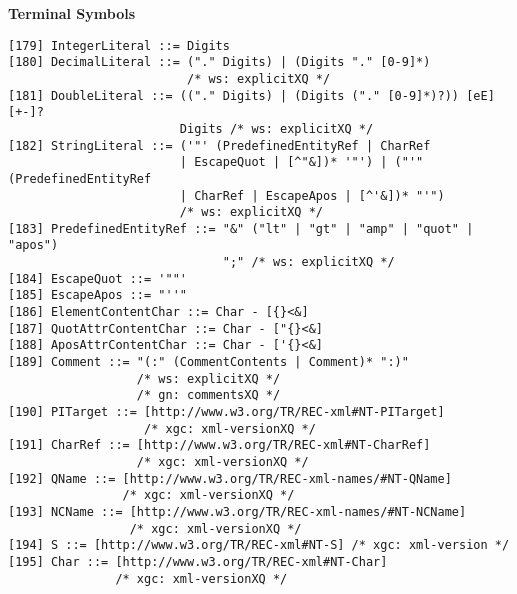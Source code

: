 \textbf{Terminal Symbols}
\begin{verbatim}
[179] IntegerLiteral ::= Digits
[180] DecimalLiteral ::= ("." Digits) | (Digits "." [0-9]*)	
                         /* ws: explicitXQ */
[181] DoubleLiteral ::= (("." Digits) | (Digits ("." [0-9]*)?)) [eE] [+-]?
                        Digits /* ws: explicitXQ */
[182] StringLiteral ::= ('"' (PredefinedEntityRef | CharRef 
                        | EscapeQuot | [^"&])* '"') | ("'" (PredefinedEntityRef
                        | CharRef | EscapeApos | [^'&])* "'")	
                        /* ws: explicitXQ */
[183] PredefinedEntityRef ::= "&" ("lt" | "gt" | "amp" | "quot" | "apos")
                              ";" /* ws: explicitXQ */
[184] EscapeQuot ::= '""'
[185] EscapeApos ::= "''"
[186] ElementContentChar ::= Char - [{}<&]
[187] QuotAttrContentChar ::= Char - ["{}<&]
[188] AposAttrContentChar ::= Char - ['{}<&]
[189] Comment ::= "(:" (CommentContents | Comment)* ":)"
                  /* ws: explicitXQ */
                  /* gn: commentsXQ */
[190] PITarget ::= [http://www.w3.org/TR/REC-xml#NT-PITarget]
                   /* xgc: xml-versionXQ */
[191] CharRef ::= [http://www.w3.org/TR/REC-xml#NT-CharRef] 
                  /* xgc: xml-versionXQ */
[192] QName ::= [http://www.w3.org/TR/REC-xml-names/#NT-QName]
                /* xgc: xml-versionXQ */
[193] NCName ::= [http://www.w3.org/TR/REC-xml-names/#NT-NCName]
                 /* xgc: xml-versionXQ */
[194] S ::= [http://www.w3.org/TR/REC-xml#NT-S] /* xgc: xml-version */
[195] Char ::= [http://www.w3.org/TR/REC-xml#NT-Char] 
               /* xgc: xml-versionXQ */
\end{verbatim}